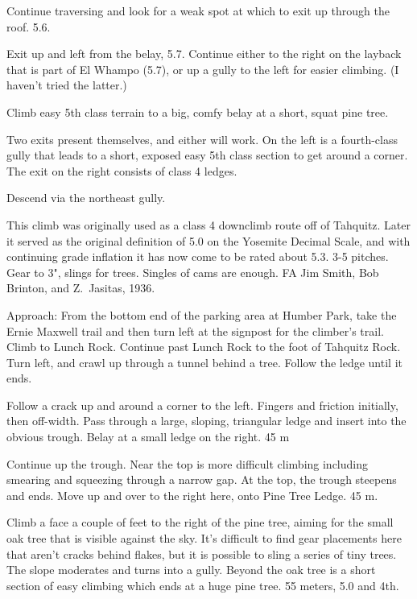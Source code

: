 \documentclass{tahquitz}
\begin{document}
 Continue traversing and look for a weak spot at which to exit up through the roof. 5.6.

 Exit up and left from the belay, 5.7. Continue either to the right on the layback
that is part of El Whampo (5.7), or up a gully to the left for easier climbing. (I haven't tried
the latter.)

 Climb easy 5th class terrain to a big, comfy belay at a short, squat pine tree.

 Two exits present themselves, and either will work. On the left is a fourth-class
gully that leads to a short, exposed easy 5th class section to get around a corner.
The exit on the right consists of class 4 ledges.

Descend via the northeast gully.




This climb was originally used as a class 4 downclimb route off of Tahquitz.
Later it served as the original definition of 5.0 on the Yosemite Decimal
Scale, and with continuing grade inflation it has now come to be
rated about 5.3. 3-5 pitches. Gear to 3",
slings for trees. Singles of cams are enough.
FA Jim Smith, Bob Brinton, and Z.~Jasitas, 1936.

Approach: From the bottom end of the parking area at Humber Park,
take the Ernie Maxwell trail and then turn left at the signpost for
the climber's trail. Climb to Lunch Rock. Continue past Lunch Rock to
the foot of Tahquitz Rock. Turn left, and crawl up through a tunnel
behind a tree. Follow the ledge until it ends.

 Follow a crack up and around a corner to the left. Fingers and
friction initially, then off-width. Pass through a large, sloping,
triangular ledge and insert into the obvious trough. Belay at a small
ledge on the right. 45 m

 Continue up the trough. Near the top is more difficult climbing
including smearing and squeezing through a narrow gap. At the top,
the trough steepens and ends. Move up and over to the right here,
onto Pine Tree Ledge. 45 m.

 Climb a face a couple of feet to the right of the pine tree,
aiming for the small oak tree that is visible against the sky. It's
difficult to find gear placements here that aren't cracks behind
flakes, but it is possible to sling a series of tiny trees. The slope
moderates and turns into a gully. Beyond the oak tree is a short
section of easy climbing which ends at a huge pine tree. 55 meters,
5.0 and 4th.
\end{document}
